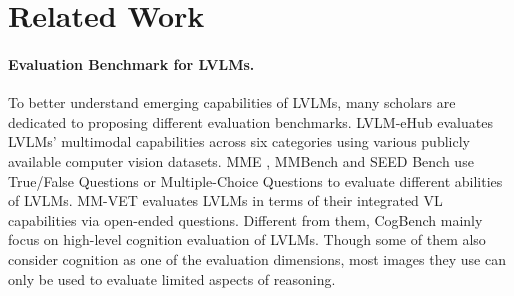 \section{Related Work}






\paragraph{Evaluation Benchmark for LVLMs.}
To better understand emerging capabilities of LVLMs, many scholars are dedicated to proposing different evaluation benchmarks.
LVLM-eHub \cite{xu2023lvlm} evaluates LVLMs' multimodal capabilities across six categories using various publicly available computer vision datasets.
MME \cite{fu2023mme}, MMBench \cite{liu2023mmbench} and SEED Bench \cite{li2023seed} use True/False Questions or Multiple-Choice Questions to evaluate different abilities of LVLMs.
MM-VET \cite{yu2023mm} evaluates LVLMs in terms of their integrated VL capabilities via open-ended questions. 
Different from them, CogBench mainly focus on high-level cognition evaluation of LVLMs. 
Though some of them also consider cognition as one of the evaluation dimensions, most images they use can only be used to evaluate limited aspects of reasoning.

